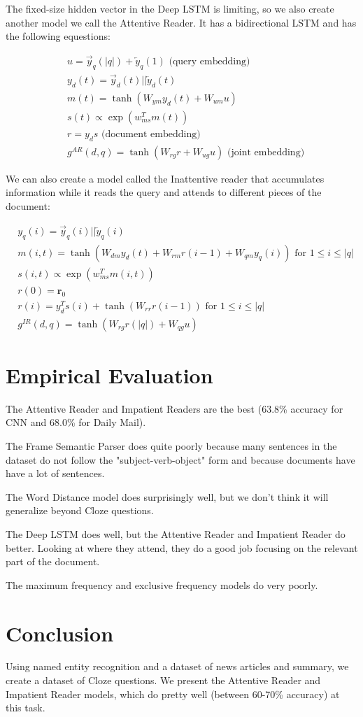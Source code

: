 \documentclass[a4paper]{article}
\begin{document}
The fixed-size hidden vector in the Deep LSTM is limiting, so we also create
another model we call the Attentive Reader. It has a bidirectional LSTM
and has the following equestions:

\begin{align}
  & u = \overrightarrow{y}_q(|q|) + \overleftarrow{y}_q(1) \text{ (query embedding)}\\
  & y_d(t) = \overrightarrow{y}_d(t) || \overleftarrow{y}_d(t) \\
  & m(t) = \tanh(W_{ym} y_d(t) + W_{um} u) \\
  & s(t) \propto \exp(w_{ms}^T m(t)) \\
  & r = y_d s \text{ (document embedding)}\\
  & g^{AR}(d, q) = \tanh(W_{rg} r + W_{ug} u) \text{ (joint embedding)}
\end{align}

We can also create a model called the Inattentive reader that accumulates
information while it reads the query and attends to different pieces of
the document:

\begin{align}
  & y_q(i) = \overrightarrow{y}_q(i) || \overleftarrow{y}_q(i) \\
  & m(i, t) = \tanh(W_{dm} y_d(t) + W_{rm} r(i - 1) + W_{qm} y_q(i)) \text{ for $1 \leq i \leq |q|$} \\
  & s(i, t) \propto \exp(w_{ms}^T m(i, t)) \\
  & r(0) = \mathbf{r}_0 \\
  & r(i) = y_d^T s(i) + \tanh(W_{rr} r(i-1)) \text{ for $1 \leq i \leq |q|$} \\
  & g^{IR}(d, q) = \tanh(W_{rg} r(|q|) + W_{qg} u)
\end{align}

\section{Empirical Evaluation}
The Attentive Reader and Impatient Readers are the best (63.8\% accuracy for CNN
and 68.0\% for Daily Mail).

The Frame Semantic Parser does quite poorly because many sentences in the
dataset do not follow the "subject-verb-object" form and because documents have
have a lot of sentences.

The Word Distance model does surprisingly well, but we don't think it will
generalize beyond Cloze questions.

The Deep LSTM does well, but the Attentive Reader and Impatient Reader do
better. Looking at where they attend, they do a good job focusing on the
relevant part of the document.

The maximum frequency and exclusive frequency models do very poorly.

\section{Conclusion}
Using named entity recognition and a dataset of news articles and summary, we
create a dataset of Cloze questions. We present the Attentive Reader and
Impatient Reader models, which do pretty well (between 60-70\% accuracy)
at this task.
\end{document}
